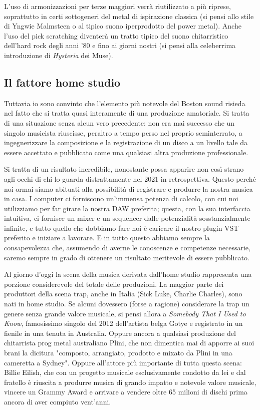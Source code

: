 \documentclass[class=book, crop=false, oneside, 12pt]{standalone}
\begin{document}
L'uso di armonizzazioni per terze maggiori verrà riutilizzato a più riprese, soprattutto in certi sottogeneri del metal di ispirazione classica (si pensi allo stile di Yngwie Malmsteen o al tipico suono iperprodotto del power metal). Anche l'uso del pick scratching diventerà un tratto tipico del suono chitarristico dell'hard rock degli anni '80 e fino ai giorni nostri (si pensi alla celeberrima introduzione di \emph{Hysteria} dei Muse).

\subsection{Il fattore home studio}
Tuttavia io sono convinto che l'elemento più notevole del Boston sound risieda nel fatto che si tratta quasi interamente di una produzione amatoriale. Si tratta di una situazione senza alcun vero precedente: non era mai successo che un singolo musicista riuscisse, peraltro a tempo perso nel proprio seminterrato, a ingegnerizzare la composizione e la registrazione di un disco a un livello tale da essere accettato e pubblicato come una qualsiasi altra produzione professionale. 

Si tratta di un risultato incredibile, nonostante possa apparire non così strano agli occhi di chi lo guarda distrattamente nel 2021 in retrospettiva. Questo perché noi ormai siamo abituati alla possibilità di registrare e produrre la nostra musica in casa. I computer ci forniscono un'immensa potenza di calcolo, con cui noi utilizziamo per far girare la nostra DAW preferita; questa, con la sua interfaccia intuitiva, ci fornisce un mixer e un sequencer dalle potenzialità sosstanzialmente infinite, e tutto quello che dobbiamo fare noi è caricare il nostro plugin VST preferito e iniziare a lavorare. E in tutto questo abbiamo sempre la consapevolezza che, assumendo di averne le conoscenze e competenze necessarie, saremo sempre in grado di ottenere un risultato meritevole di essere pubblicato. 

Al giorno d'oggi la scena della musica derivata dall'home studio rappresenta una porzione considerevole del totale delle produzioni. La maggior parte dei produttori della scena trap, anche in Italia (Sick Luke, Charlie Charles), sono nati in home studio. Se alcuni dovessero (forse a ragione) considerare la trap un genere senza grande valore musicale, si pensi allora a \emph{Somebody That I Used to Know}, famosissimo singolo del 2012 dell'artista belga Gotye e registrato in un fienile in una tenuta in Australia. Oppure ancora a qualsiasi produzione del chitarrista prog metal australiano Plini, che non dimentica mai di apporre ai suoi brani la dicitura "composto, arrangiato, prodotto e mixato da Plini in una cameretta a Sydney"\cite{yt:plini}. Oppure all'attore più importante di tutta questa scena: Billie Eilish, che con un progetto musicale esclusivamente condotto da lei e dal fratello è riuscita a produrre musica di grando impatto e notevole valore musicale, vincere un Grammy Award e arrivare a vendere oltre 65 milioni di dischi prima ancora di aver compiuto vent'anni.
\end{document}
